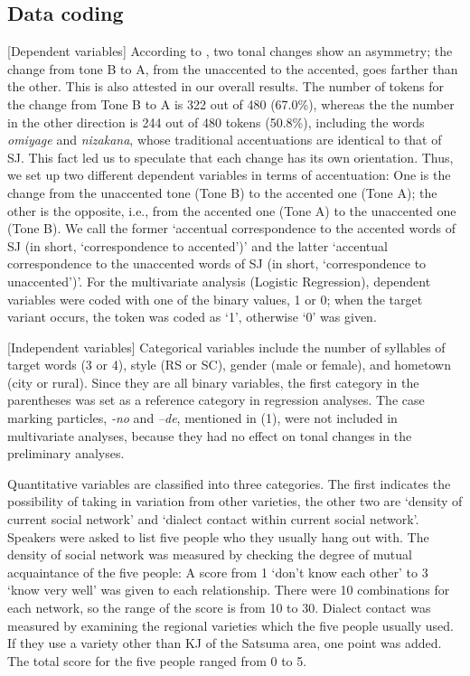 \documentclass[output=paper]{LSP/langsci}
\begin{document}
\subsection{Data coding}
[Dependent variables] According to \citet{kubozono_tonal_2007}, two tonal changes show an asymmetry; the change from tone B to A, from the unaccented to the accented, goes farther than the other. This is also attested in our overall results. The number of tokens for the change from Tone B to A is 322 out of 480 (67.0\%), whereas the the number in the other direction is 244 out of 480 tokens (50.8\%), including the words \textit{omiyage} and \textit{nizakana}, whose traditional accentuations are identical to that of SJ. This fact led us to speculate that each change has its own orientation. Thus, we set up two different dependent variables in terms of accentuation: One is the change from the unaccented tone (Tone B) to the accented one (Tone A); the other is the opposite, i.e., from the accented one (Tone A) to the unaccented one (Tone B). We call the former ‘accentual correspondence to the accented words of SJ (in short, ‘correspondence to accented’)’ and the latter ‘accentual correspondence to the unaccented words of SJ (in short, ‘correspondence to unaccented’)’. For the multivariate analysis (Logistic Regression), dependent variables were coded with one of the binary values, 1 or 0; when the target variant occurs, the token was coded as ‘1’, otherwise ‘0’ was given.

[Independent variables] Categorical variables include the number of syllables of target words (3 or 4), style (RS or SC), gender (male or female), and hometown (city or rural). Since they are all binary variables, the first category in the parentheses was set as a reference category in regression analyses. The case marking particles, \textit{{}-no} and \textit{–de}, mentioned in (1), were not included in multivariate analyses, because they had no effect on tonal changes in the preliminary analyses.

Quantitative variables are classified into three categories. The first indicates the possibility of taking in variation from other varieties, the other two are ‘density of current social network’ and ‘dialect contact within current social network’. Speakers were asked to list five people who they usually hang out with. The density of social network was measured by checking the degree of mutual acquaintance of the five people: A score from 1 ‘don’t know each other’ to 3 ‘know very well’ was given to each relationship. There were 10 combinations for each network, so the range of the score is from 10 to 30. Dialect contact was measured by examining the regional varieties which the five people usually used. If they use a variety other than KJ of the Satsuma area, one point was added. The total score for the five people ranged from 0 to 5.
\end{document}

